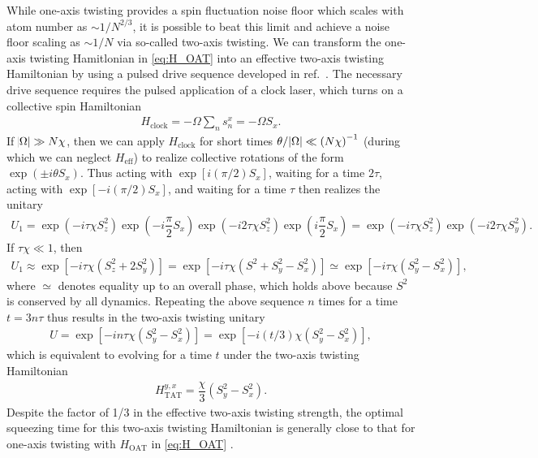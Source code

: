 \documentclass[aps,notitlepage,nofootinbib,11pt]{revtex4-1}
\renewcommand{\t}{\text} %
\newcommand{\f}[2]{\dfrac{#1}{#2}} %
\newcommand{\p}[1]{\left(#1\right)} %
\renewcommand{\sp}[1]{\left[#1\right]} %
\newcommand{\1}{\hat{\mathds{1}}}
\begin{document}
While one-axis twisting provides a spin fluctuation noise floor which
scales with atom number as $\sim1/N^{2/3}$, it is possible to beat
this limit and achieve a noise floor scaling as $\sim1/N$ via
so-called two-axis twisting.  We can transform the one-axis twisting
Hamitlonian in \eqref{eq:H_OAT} into an effective two-axis twisting
Hamiltonian by using a pulsed drive sequence developed in
ref.~\cite{liu2011spin}.  The necessary drive sequence requires the
pulsed application of a clock laser, which turns on a collective spin
Hamiltonian
\begin{align}
  H_{\t{clock}} = -\Omega \sum_n s_n^x = -\Omega S_x.
\end{align}
If $\abs{\Omega}\gg N\chi$, then we can apply $H_{\t{clock}}$ for
short times $\theta/\abs{\Omega}\ll\p{N\chi}^{-1}$ (during which we
can neglect $H_{\t{eff}}$) to realize collective rotations of the form
$\exp\p{\pm i\theta S_x}$.  Thus acting with $\exp\sp{i\p{\pi/2}S_x}$,
waiting for a time $2\tau$, acting with $\exp\sp{-i\p{\pi/2}S_x}$, and
waiting for a time $\tau$ then realizes the unitary
\begin{align}
  U_1 = \exp\p{-i\tau\chi S_z^2} \exp\p{-i\f{\pi}{2}S_x}
  \exp\p{-i2\tau\chi S_z^2} \exp\p{i\f{\pi}{2}S_x}
  = \exp\p{-i\tau\chi S_z^2} \exp\p{-i2\tau\chi S_y^2}.
\end{align}
If $\tau\chi\ll1$, then
\begin{align}
  U_1 \approx \exp\sp{-i\tau\chi\p{S_z^2 + 2S_y^2}}
  = \exp\sp{-i\tau\chi\p{S^2 + S_y^2 - S_x^2}}
  \simeq \exp\sp{-i\tau\chi\p{S_y^2 - S_x^2}},
\end{align}
where $\simeq$ denotes equality up to an overall phase, which holds
above because $S^2$ is conserved by all dynamics.  Repeating the above
sequence $n$ times for a time $t=3n\tau$ thus results in the two-axis
twisting unitary
\begin{align}
  U = \exp\sp{-in\tau\chi\p{S_y^2 - S_x^2}}
  = \exp\sp{-i\p{t/3}\chi\p{S_y^2 - S_x^2}},
\end{align}
which is equivalent to evolving for a time $t$ under the two-axis
twisting Hamiltonian
\begin{align}
  H_{\t{TAT}}^{y,x} = \f{\chi}{3}\p{S_y^2 - S_x^2}.
  \label{eq:H_TAT_pulse}
\end{align}
Despite the factor of 1/3 in the effective two-axis twisting strength,
the optimal squeezing time for this two-axis twisting Hamiltonian is
generally close to that for one-axis twisting with $H_{\t{OAT}}$ in
\eqref{eq:H_OAT} \cite{liu2011spin}.
\end{document}
